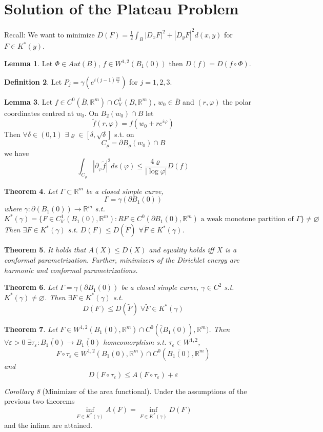 \documentclass[a4paper, 12pt]{article}
\theoremstyle{plain}
\newtheorem{theorem}{Theorem}[section] %
\theoremstyle{definition}
\newtheorem{definition}[theorem]{Definition} %
\theoremstyle{lemma}
\newtheorem{lemma}[theorem]{Lemma}
\theoremstyle{remark}
\theoremstyle{corollary}
\newtheorem{corollary}[theorem]{Corollary}
\theoremstyle{example}
\begin{document}
	\section{Solution of the Plateau Problem}
	Recall: We want to minimize $D(F) = \frac{1}{2}\int_B \left|D_x F\right|^2 + \left|D_y F\right|^2 d(x,y)$ for $F \in K^*(y)$.\\
	\begin{lemma}
		Let $\Phi \in Aut(B)$, $f \in W^{1,2}(B_1(0))$ then $D(f) = D(f\circ \Phi)$.
	\end{lemma}
	\begin{definition}
		Let $P_j = \gamma(e^{i(j-1)\frac{2\pi}{3}})$ for $j=1,2,3$.
	\end{definition}
	\begin{lemma}
		Let $f \in C^0(\overline{B}, \mathbb{R}^m)\cap C^1_{b'}(B, \mathbb{R}^m)$, $w_0 \in \overline{B}$ and $(r,\varphi)$ the polar coordinates centred at $w_0$. On $B_2(w_0) \cap B$ let \[\tilde{f}(r,\varphi) = f(w_0 + re^{i\varphi})\] Then $\forall \delta \in (0,1)$ $\exists \varrho \in [\delta, \sqrt{\delta}]$ s.t. on \[C_\varrho = \partial B_\varrho(w_0) \cap B\] we have \[\int_{C_\varrho} \left|\partial_\varphi \tilde{f}\right|^2 ds(\varphi) \leq \frac{4\varrho}{\left|\log \varphi\right|} D(f)\]
	\end{lemma}
	\begin{theorem}
		Let $\Gamma \subset \mathbb{R}^m$ be a closed simple curve, \[\Gamma = \gamma(\partial B_1(0))\] where $\gamma: \partial(B_1(0)) \to \mathbb{R}^m$ s.t. \[K^*(\gamma) = \{F \in C^1_{b'}(B_1(0),\mathbb{R}^m) : RF \in C^0(\partial B_1(0), \mathbb{R}^m) \text{ a weak monotone partition of } \Gamma\} \neq \varnothing\]
		Then $\exists F \in K^*(\gamma)$ s.t. $D(F) \leq D(\tilde{F})$ $\forall \tilde{F} \in K^*(\gamma)$.
	\end{theorem}
	\begin{theorem}
		It holds that $A(X) \leq D(X)$ and equality holds iff $X$ is a conformal parametrization. Further, minimizers of the Dirichlet energy are harmonic and conformal parametrizations. 
	\end{theorem}
	\begin{theorem}
		Let $\Gamma = \gamma(\partial B_1(0))$ be a closed simple curve, $\gamma \in C^2$ s.t. $K^*(\gamma) \neq \varnothing$. Then $\exists F \in K^*(\gamma)$ s.t. \[D(F)\leq D(\tilde{F}) \; \forall \tilde{F} \in K^*(\gamma)\]
	\end{theorem}
	\begin{theorem}
		Let $F \in W^{1,2}(B_1(0), \mathbb{R}^m)\cap C^0(\overline(B_1(0)), \mathbb{R}^m)$. Then $\forall \varepsilon > 0 \; \exists \tau_\varepsilon : \overline{B_1(0)} \to \overline{B_1(0)}$ homeomorphism s.t. $\tau_\varepsilon \in W^{1,2}$, $$F \circ \tau_\varepsilon \in W^{1,2}(B_1(0), \mathbb{R}^m) \cap C^0(\overline{B_1(0)}, \mathbb{R}^m)$$ and \[D(F \circ \tau_\varepsilon) \leq A(F\circ \tau_\varepsilon) + \varepsilon\]
	\end{theorem}
	\begin{corollary}[Minimizer of the area functional]
		Under the assumptions of the previous two theorems \[\inf_{F \in K^*(\gamma)} A(F) = \inf_{F \in K^*(\gamma)} D(F)\] and the infima are attained.
	\end{corollary}
\end{document}
